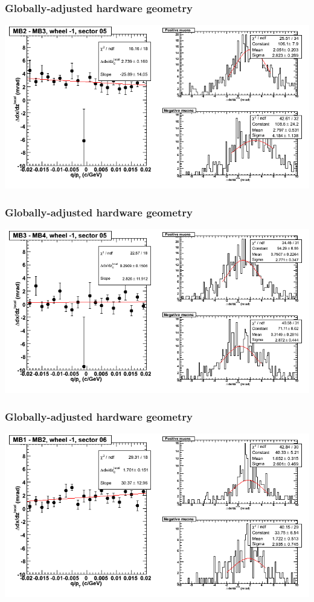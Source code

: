 \documentclass[compress]{beamer}
\begin{document}
\begin{frame}
\frametitle{Globally-adjusted hardware geometry}
\includegraphics[width=\linewidth]{NOV4_segdiffs_HW/dt13_slope_B_05_23.png}
\end{frame}

\begin{frame}
\frametitle{Globally-adjusted hardware geometry}
\includegraphics[width=\linewidth]{NOV4_segdiffs_HW/dt13_slope_B_05_34.png}
\end{frame}

\begin{frame}
\frametitle{Globally-adjusted hardware geometry}
\includegraphics[width=\linewidth]{NOV4_segdiffs_HW/dt13_slope_B_06_12.png}
\end{frame}
\end{document}
